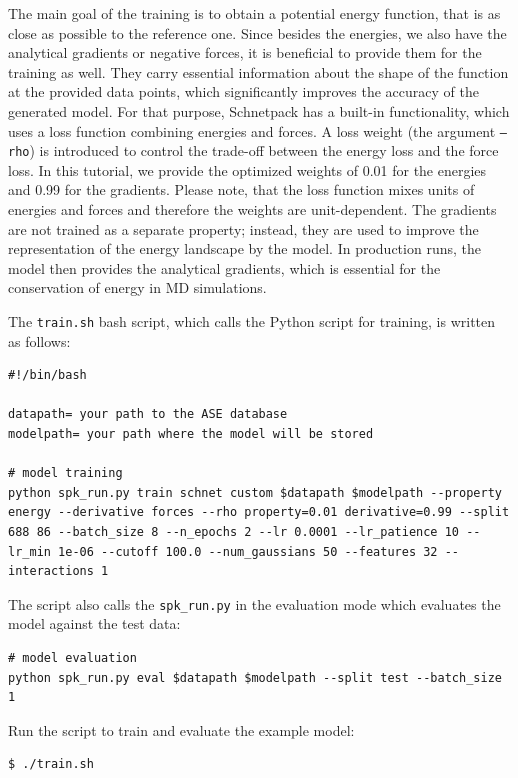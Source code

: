 The main goal of the training is to obtain a potential energy function, that is as close as possible to the reference one. Since besides the energies, we also have the analytical gradients or negative forces, it is beneficial to provide them for the training as well. They carry essential information about the shape of the function at the provided data points, which significantly improves the accuracy of the generated model. For that purpose, Schnetpack has a built-in functionality, which uses a loss function combining energies and forces. A loss weight (the argument \texttt{--rho}) is introduced to control the trade-off between the energy loss and the force loss. In this tutorial, we provide the optimized weights of 0.01 for the energies and 0.99 for the gradients. Please note, that the loss function mixes units of energies and forces and therefore the weights are unit-dependent. The gradients are not trained as a separate property; instead, they are used to improve the representation of the energy landscape by the model. In production runs, the model then provides the analytical gradients, which is essential for the conservation of energy in MD simulations.

The \texttt{train.sh} bash script, which calls the Python script for training, is written as follows:
\begin{lstlisting}[breaklines=true, breakatwhitespace=false]
#!/bin/bash

datapath= your path to the ASE database
modelpath= your path where the model will be stored

# model training
python spk_run.py train schnet custom $datapath $modelpath --property energy --derivative forces --rho property=0.01 derivative=0.99 --split 688 86 --batch_size 8 --n_epochs 2 --lr 0.0001 --lr_patience 10 --lr_min 1e-06 --cutoff 100.0 --num_gaussians 50 --features 32 --interactions 1
\end{lstlisting}


The script also calls the \texttt{spk\_run.py} in the evaluation mode which evaluates the model against the test data:

\begin{lstlisting}[breaklines=true, breakatwhitespace=false]
# model evaluation
python spk_run.py eval $datapath $modelpath --split test --batch_size 1
\end{lstlisting}


Run the script to train and evaluate the example model:

\begin{lstlisting}[breaklines=true, breakatwhitespace=false]
$ ./train.sh
\end{lstlisting}


